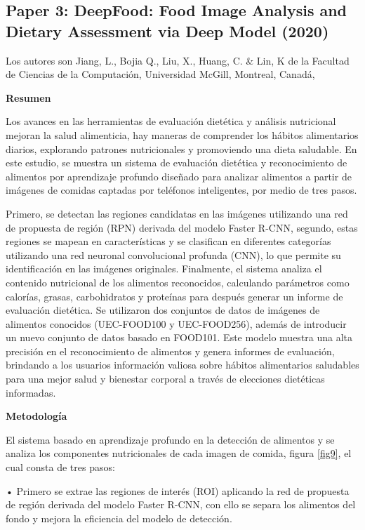 \thinspace

\subsection{Paper 3: DeepFood: Food Image Analysis and Dietary Assessment via Deep Model (2020)}

Los autores son Jiang, L., Bojia Q., Liu, X., Huang, C. \& Lin, K de la Facultad de Ciencias de la Computación, Universidad McGill, Montreal, Canadá, \parencite{jiang2020deepfood}

\textbf{Resumen}

\thinspace
Los avances en las herramientas de evaluación dietética y análisis nutricional mejoran la salud alimenticia, hay maneras de comprender los hábitos alimentarios diarios, explorando patrones nutricionales y promoviendo una dieta saludable. En este estudio, se muestra un sistema de evaluación dietética y reconocimiento de alimentos por aprendizaje profundo diseñado para analizar alimentos a partir de imágenes de comidas captadas por teléfonos inteligentes, por medio de tres pasos. 

Primero, se detectan las regiones candidatas en las imágenes utilizando una red de propuesta de región (RPN) derivada del modelo Faster R-CNN, segundo, estas regiones se mapean en características y se clasifican en diferentes categorías utilizando una red neuronal convolucional profunda (CNN), lo que permite su identificación en las imágenes originales. Finalmente, el sistema analiza el contenido nutricional de los alimentos reconocidos, calculando parámetros como calorías, grasas, carbohidratos y proteínas para después generar un informe de evaluación dietética. Se utilizaron dos conjuntos de datos de imágenes de alimentos conocidos (UEC-FOOD100 y UEC-FOOD256), además de introducir un nuevo conjunto de datos basado en FOOD101. Este modelo muestra una alta precisión en el reconocimiento de alimentos y genera informes de evaluación, brindando a los usuarios información valiosa sobre hábitos alimentarios saludables para una mejor salud y bienestar corporal a través de elecciones dietéticas informadas.
\thinspace

\textbf{Metodología}

\thinspace
El sistema basado en aprendizaje profundo en la detección de alimentos y se analiza los componentes nutricionales de cada imagen de comida, figura \ref{fig9}, el cual consta de tres pasos:

• Primero se extrae las regiones de interés (ROI) aplicando la red de propuesta de región derivada del modelo Faster R-CNN, con ello se separa los alimentos del fondo y mejora la eficiencia del modelo de detección.

